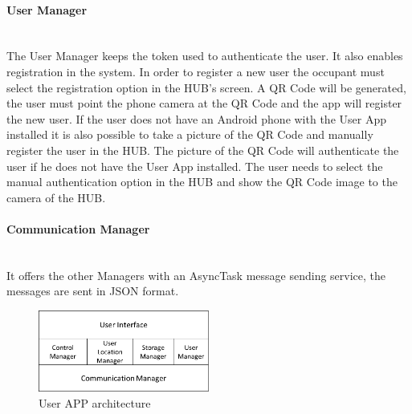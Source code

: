 \paragraph{User Manager}\mbox{}\\
The User Manager keeps the token used to authenticate the user. It also enables registration in the system. In order to register a new user the occupant must select the registration option in the HUB's screen. A QR Code will be generated, the user must point the phone camera at the QR Code and the app will register the new user. If the user does not have an Android phone with the User App installed it is also possible to take a picture of the QR Code and manually register the user in the HUB. The picture of the QR Code will authenticate the user if he does not have the User App installed. The  user needs to select the manual authentication option in the HUB and show the QR Code image to the camera of the HUB.

\paragraph{Communication Manager}\mbox{}\\
It offers the other Managers with an AsyncTask message sending service, the messages are sent in JSON format.

\begin{figure}[h]
\centering
\includegraphics[width=0.5\textwidth]{Figures/software3}
\caption{User APP architecture }
\label{software3}
\end{figure}
